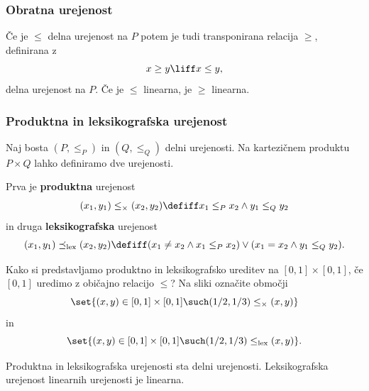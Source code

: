 \subsubsection{Obratna urejenost}

Če je $\leq$ delna urejenost na $P$ potem je tudi transponirana relacija $\geq$, definirana z
%
\begin{equation*}
    x \geq y \liff x \leq y,
\end{equation*}
%
delna urejenost na $P$. Če je $\leq$ linearna, je $\geq$ linearna.

\subsubsection{Produktna in leksikografska urejenost}

Naj bosta $(P, {\leq_P})$ in $(Q, {\leq_Q})$ delni urejenosti. Na kartezičnem produktu $P \times Q$ lahko definiramo dve urejenosti.

Prva je \textbf{produktna} urejenost
%
\begin{equation*}
  (x_1,y_1) \leq_{\times} (x_2,y_2) \defiff x_1 \leq_P x_2 \land y_1 \leq_Q y_2
\end{equation*}
%
in druga \textbf{leksikografska} urejenost
%
\begin{equation*}
  (x_1,y_1) \preceq_\mathrm{lex} (x_2,y_2)
  \defiff (x_1 \neq x_2 \land x_1 \leq_P x_2) \lor (x_1 = x_2 \land y_1 \leq_Q y_2).
\end{equation*}


\begin{vaja}
  Kako si predstavljamo produktno in leksikografsko ureditev na $[0,1] \times [0,1]$, če $[0,1]$ uredimo z običajno relacijo $\leq$? Na sliki označite območji
  \begin{equation*}
    \set{(x,y) \in [0,1] \times [0, 1] \such (1/2,1/3) \leq_\times (x,y)}
  \end{equation*}
  in
  \begin{equation*}
    \set{(x,y) \in [0,1] \times [0, 1] \such (1/2,1/3) \leq_\mathrm{lex} (x,y)}.
  \end{equation*}
\end{vaja}

\begin{izjava}
  Produktna in leksikografska urejenosti sta delni urejenosti. Leksikografska urejenost linearnih urejenosti je linearna.
\end{izjava}

